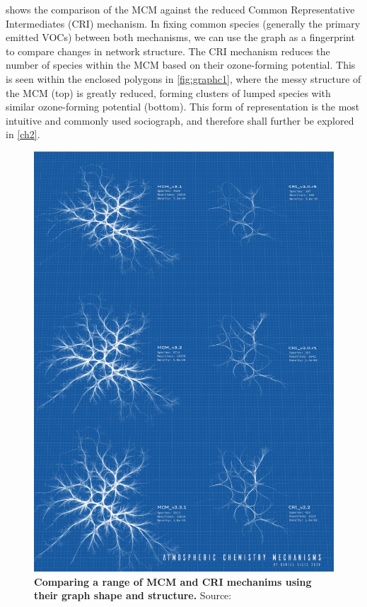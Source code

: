  shows the comparison of the MCM against the reduced Common Representative Intermediates (CRI) \citep{cri} mechanism. In fixing common species (generally the primary emitted VOCs) between both mechanisms, we can use the graph as a fingerprint to compare changes in network structure. The CRI mechanism reduces the number of species within the MCM based on their ozone-forming potential. This is seen within the enclosed polygons in \autoref{fig:graphc1}, where the messy structure of the MCM (top) is greatly reduced, forming clusters of lumped species with similar ozone-forming potential (bottom). This form of representation is the most intuitive and commonly used sociograph, and therefore shall further be explored in \autoref{ch2}.



\begin{figure}[H]
     \centering
         \includegraphics[width=1\textwidth]{poster.png}
        \caption{\textbf{Comparing a range of MCM and CRI mechanims using their graph shape and structure.} Source: \cite{mcmblue}}
        \label{fig:graphc1}
\end{figure}




